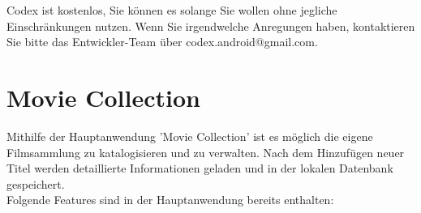 Codex ist kostenlos, Sie können es solange Sie wollen ohne jegliche Einschränkungen nutzen. Wenn Sie irgendwelche Anregungen haben, kontaktieren Sie bitte das Entwickler-Team über codex.android@gmail.com.\cite{Codex}

\section{Movie Collection}

Mithilfe der Hauptanwendung 'Movie Collection' ist es möglich die eigene Filmsammlung zu katalogisieren und zu verwalten. Nach dem Hinzufügen neuer Titel werden detaillierte Informationen geladen und in der lokalen Datenbank gespeichert.\cite{MC} \\

Folgende Features sind in der Hauptanwendung bereits enthalten:\\
